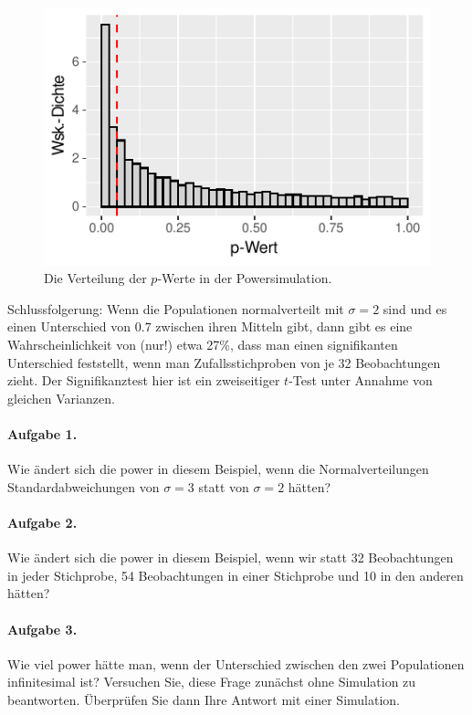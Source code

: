 \documentclass[oneside, 10pt]{book}\usepackage[]{graphicx}\usepackage[]{xcolor}
\newenvironment{knitrout}{}{} %
\begin{document}
\begin{knitrout}
\color{fgcolor}\begin{figure}[tp]

{\centering \includegraphics[width=.5\textwidth]{figs/unnamed-chunk-412-1} 

}

\caption{Die Verteilung der $p$-Werte in der Powersimulation.\label{fig:pwertesimulationpower}}\label{fig:unnamed-chunk-412}
\end{figure}

\end{knitrout}

Schlussfolgerung: Wenn die Populationen normalverteilt
mit $\sigma = 2$ sind und es einen Unterschied von $0.7$ zwischen
ihren Mitteln gibt, dann gibt es eine Wahrscheinlichkeit
von (nur!) etwa 27\%, dass man einen signifikanten
Unterschied feststellt, wenn man Zufallsstichproben
von je 32 Beobachtungen zieht.
Der Signifikanztest hier ist ein zweiseitiger $t$-Test
unter Annahme von gleichen Varianzen.

\paragraph{Aufgabe 1.} 
Wie ändert sich die power in diesem
Beispiel, wenn die Normalverteilungen Standardabweichungen von $\sigma = 3$
statt von $\sigma = 2$ hätten?

\paragraph{Aufgabe 2.} 
Wie ändert sich die power in diesem
Beispiel, wenn wir statt 32 Beobachtungen in jeder Stichprobe,
54 Beobachtungen in einer Stichprobe und 10 in den anderen hätten?

\paragraph{Aufgabe 3.} 
Wie viel power hätte man, wenn
der Unterschied zwischen den zwei Populationen infinitesimal ist?
Versuchen Sie, diese Frage zunächst ohne Simulation zu beantworten.
Überprüfen Sie dann Ihre Antwort mit einer Simulation.
\end{document}
